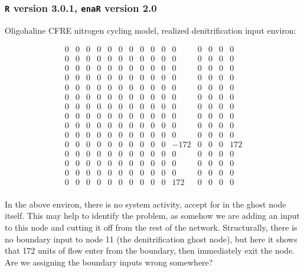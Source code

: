 \documentclass[]{article}
\begin{document}
\subsubsection{\texttt{R} version 3.0.1, \texttt{enaR} version 2.0}

Oligohaline CFRE nitrogen cycling model, realized denitrification
input environ:  

\tiny

\[
\begin{array}{ccccccccccccccc}
  0 & 0 & 0 & 0 & 0 & 0 & 0 & 0 & 0 & 0 & 0 & 0 & 0 & 0 & 0 \\
  0 & 0 & 0 & 0 & 0 & 0 & 0 & 0 & 0 & 0 & 0 & 0 & 0 & 0 & 0 \\
  0 & 0 & 0 & 0 & 0 & 0 & 0 & 0 & 0 & 0 & 0 & 0 & 0 & 0 & 0 \\
  0 & 0 & 0 & 0 & 0 & 0 & 0 & 0 & 0 & 0 & 0 & 0 & 0 & 0 & 0 \\
  0 & 0 & 0 & 0 & 0 & 0 & 0 & 0 & 0 & 0 & 0 & 0 & 0 & 0 & 0 \\
  0 & 0 & 0 & 0 & 0 & 0 & 0 & 0 & 0 & 0 & 0 & 0 & 0 & 0 & 0 \\
  0 & 0 & 0 & 0 & 0 & 0 & 0 & 0 & 0 & 0 & 0 & 0 & 0 & 0 & 0 \\
  0 & 0 & 0 & 0 & 0 & 0 & 0 & 0 & 0 & 0 & 0 & 0 & 0 & 0 & 0 \\
  0 & 0 & 0 & 0 & 0 & 0 & 0 & 0 & 0 & 0 & 0 & 0 & 0 & 0 & 0 \\
  0 & 0 & 0 & 0 & 0 & 0 & 0 & 0 & 0 & 0 & 0 & 0 & 0 & 0 & 0 \\
  0 & 0 & 0 & 0 & 0 & 0 & 0 & 0 & 0 & 0 & -172 & 0 & 0 & 0 & 172 \\
  0 & 0 & 0 & 0 & 0 & 0 & 0 & 0 & 0 & 0 & 0 & 0 & 0 & 0 & 0 \\
  0 & 0 & 0 & 0 & 0 & 0 & 0 & 0 & 0 & 0 & 0 & 0 & 0 & 0 & 0 \\
  0 & 0 & 0 & 0 & 0 & 0 & 0 & 0 & 0 & 0 & 0 & 0 & 0 & 0 & 0 \\
  0 & 0 & 0 & 0 & 0 & 0 & 0 & 0 & 0 & 0 & 172 & 0 & 0 & 0 & 0 \\
\end{array}
\]

\normalsize

In the above environ, there is no system activity, accept for in the
ghost node itself.  This may help to identify the problem, as somehow
we are adding an input to this node and cutting it off from the rest
of the network.  Structurally, there is no boundary input to node 11
(the denitrification ghost node), but here it shows that 172 units of
flow enter from the boundary, then immediately exit the node.  Are we
assigning the boundary inputs wrong somewhere?
\end{document}
